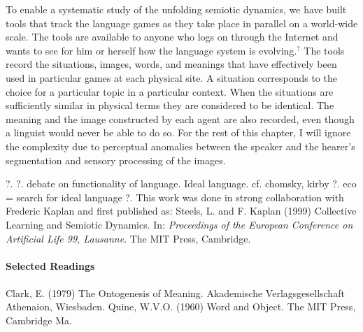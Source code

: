 To enable a systematic study of the unfolding semiotic dynamics, 
we have built tools that track the language games 
as they take place in parallel on a world-wide scale. The tools 
are available to anyone who logs on through the Internet
and wants to see for him or herself how the language
system is evolving.$^?$ The tools record the 
situations, images, words, and meanings that have 
effectively been used in particular games at each 
physical site. A situation corresponds to the 
choice for a particular topic in a particular
context. When the situations are 
sufficiently similar in physical terms 
they are considered to be identical. The meaning and the 
image constructed by each agent are also 
recorded, even though a linguist would never be able to 
do so. For the rest of this chapter, I will ignore 
the complexity due to perceptual anomalies between 
the speaker and the hearer's segmentation and sensory 
processing of the images. 

\vspace{0.2cm}
\newline
\hspace{-0.5cm}
?. 
\vspace{0.2cm}
\newline
\hspace{-0.5cm}
?. debate on functionality of language. Ideal language. 
cf. chomsky, kirby 
\vspace{0.2cm}
\newline
\hspace{-0.5cm}
?. eco = search for ideal language
\vspace{0.2cm}
\newline
\hspace{-0.5cm}
?. This work was done in strong collaboration with 
Frederic Kaplan and first published as: 
Steels, L. and F. Kaplan (1999) Collective Learning and Semiotic 
Dynamics. In: {\it Proceedings of the European Conference on 
Artificial Life 99, Lausanne}. The MIT Press, Cambridge. 

\bigskip
\paragraph{\bf Selected Readings}
\paragraph{}
\footnotesize

\hspace{-0.5cm}
Clark, E. (1979) The Ontogenesis of Meaning. Akademische
Verlagsgesellschaft Athenaion, Wiesbaden. 
\vspace{0.2cm}
\newline
\hspace{-0.5cm}
Quine, W.V.O. (1960) Word and Object. The MIT Press, 
Cambridge Ma.
\normalsize
